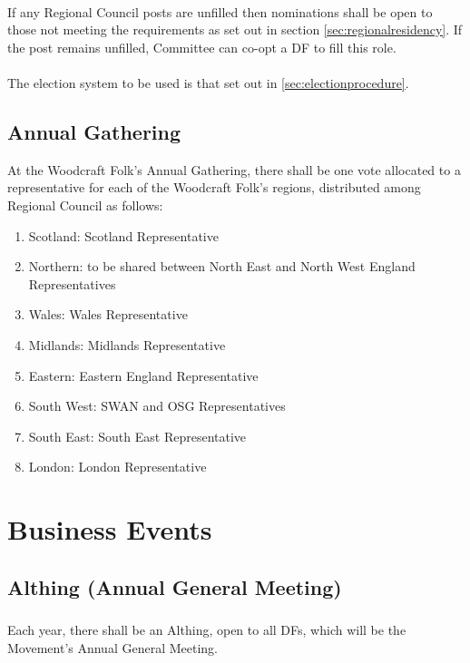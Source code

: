 \documentclass[a4paper, 12pt]{report}
\begin{document}
\paragraph{}
If any Regional Council posts are unfilled then nominations shall be open to those not meeting the requirements as set out in section \ref{sec:regionalresidency}. If the post remains unfilled, Committee can co-opt a DF to fill this role.
\paragraph{}
The election system to be used is that set out in \ref{sec:electionprocedure}.

\subsection{Annual Gathering}
At the Woodcraft Folk's Annual Gathering, there shall be one vote allocated to a representative for each of the Woodcraft Folk's regions, distributed among Regional Council as follows:
\begin{enumerate}[\hspace{0.5cm}(a)]
\item Scotland: Scotland Representative
\item Northern: to be shared between North East and North West England Representatives
\item Wales: Wales Representative
\item Midlands: Midlands Representative
\item Eastern: Eastern England Representative
\item South West: SWAN and OSG Representatives
\item South East: South East Representative
\item London: London Representative
\end{enumerate}
\section{Business Events}
\label{sec:business}
\subsection{Althing (Annual General Meeting)}
\label{sec:althing}
\subsubsection{}
Each year, there shall be an Althing, open to all DFs, which will be the Movement's Annual General Meeting.
\end{document}
